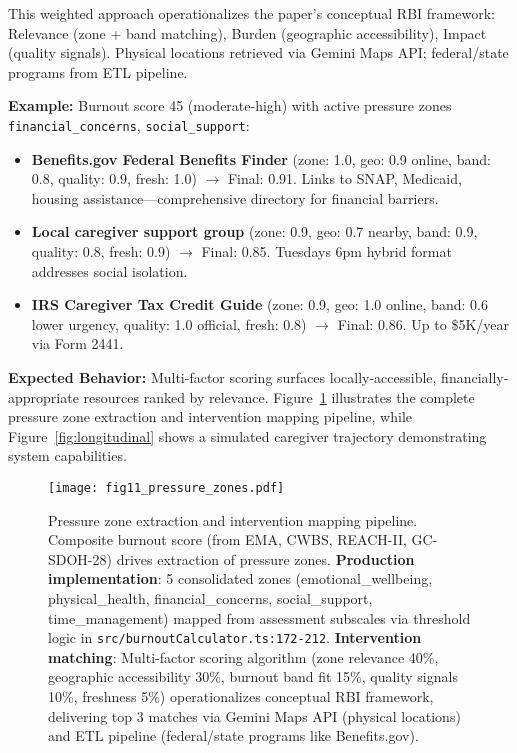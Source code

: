 \documentclass{article}
\begin{document}
This weighted approach operationalizes the paper's conceptual RBI framework: Relevance (zone + band matching), Burden (geographic accessibility), Impact (quality signals). Physical locations retrieved via Gemini Maps API; federal/state programs from ETL pipeline.

\textbf{Example:} Burnout score 45 (moderate-high) with active pressure zones \texttt{financial\_concerns}, \texttt{social\_support}:
\begin{itemize}
    \item \textbf{Benefits.gov Federal Benefits Finder} (zone: 1.0, geo: 0.9 online, band: 0.8, quality: 0.9, fresh: 1.0) $\rightarrow$ Final: 0.91. Links to SNAP, Medicaid, housing assistance—comprehensive directory for financial barriers.
    \item \textbf{Local caregiver support group} (zone: 0.9, geo: 0.7 nearby, band: 0.9, quality: 0.8, fresh: 0.9) $\rightarrow$ Final: 0.85. Tuesdays 6pm hybrid format addresses social isolation.
    \item \textbf{IRS Caregiver Tax Credit Guide} (zone: 0.9, geo: 1.0 online, band: 0.6 lower urgency, quality: 1.0 official, fresh: 0.8) $\rightarrow$ Final: 0.86. Up to \$5K/year via Form 2441.
\end{itemize}

\textbf{Expected Behavior:} Multi-factor scoring surfaces locally-accessible, financially-appropriate resources ranked by relevance. Figure~\ref{fig:pressure_zones} illustrates the complete pressure zone extraction and intervention mapping pipeline, while Figure~\ref{fig:longitudinal} shows a simulated caregiver trajectory demonstrating system capabilities.

%
\begin{figure}[htbp]%
\centering%
\texttt{[image: fig11\_pressure\_zones.pdf]}%
\caption{Pressure zone extraction and intervention mapping pipeline. Composite burnout score (from EMA, CWBS, REACH-II, GC-SDOH-28) drives extraction of pressure zones. \textbf{Production implementation}: 5 consolidated zones (emotional\_wellbeing, physical\_health, financial\_concerns, social\_support, time\_management) mapped from assessment subscales via threshold logic in \texttt{src/burnoutCalculator.ts:172-212}. \textbf{Intervention matching}: Multi-factor scoring algorithm (zone relevance 40\%, geographic accessibility 30\%, burnout band fit 15\%, quality signals 10\%, freshness 5\%) operationalizes conceptual RBI framework, delivering top 3 matches via Gemini Maps API (physical locations) and ETL pipeline (federal/state programs like Benefits.gov).}%
\label{fig:pressure_zones}%
\end{figure}%
\end{document}
